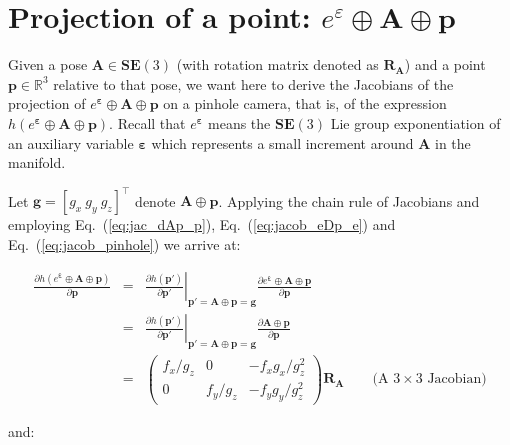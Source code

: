 \documentclass[a4paper,11pt]{report}
\newcommand{\E}{{\bm{\varepsilon}}}
\newcommand{\A}{{\mathbf{A}}}
\begin{document}
\section{Projection of a point: $e^\varepsilon \oplus \mathbf{A} \oplus \mathbf{p}$}

Given a pose $\mathbf{A} \in \mathbf{SE}(3)$ 
(with rotation matrix denoted as $\mathbf{R_A}$)
and a point 
$\mathbf{p} \in \mathbb{R}^3$
relative to that pose, we want here to derive the Jacobians of 
the projection of $e^\E \oplus \A \oplus \mathbf{p}$ on a pinhole camera, that is, 
of the expression $h(e^\E \oplus \A \oplus \mathbf{p})$.
Recall that $e^\E$ means the $\mathbf{SE}(3)$ Lie group exponentiation 
of an auxiliary variable $\E$ which represents a small increment around $\A$ in the manifold.

Let $\mathbf{g}=[g_x ~ g_y ~ g_z]^\top$ denote $\mathbf{A} \oplus \mathbf{p}$.
Applying the chain rule of Jacobians and employing Eq.~(\ref{eq:jac_dAp_p}), 
Eq.~(\ref{eq:jacob_eDp_e}) 
and  Eq.~(\ref{eq:jacob_pinhole})
we arrive at:

\begin{eqnarray}
\frac{\partial h(e^\E \oplus \A \oplus \mathbf{p})}{\partial \mathbf{p}} 
&=& 
\left. \frac{\partial h(\mathbf{p'})}{\partial \mathbf{p'}} \right|_{ \mathbf{p'} = \A \oplus \mathbf{p} = \mathbf{g} }
\frac{\partial e^\E \oplus \A \oplus \mathbf{p} }{\partial \mathbf{p}} \\
&=& 
\left. \frac{\partial h(\mathbf{p'})}{\partial \mathbf{p'}} \right|_{ \mathbf{p'} = \A \oplus \mathbf{p} = \mathbf{g} }
\frac{\partial \A \oplus \mathbf{p} }{\partial \mathbf{p}} \\
&=& 
\left(
\begin{array}{ccc}
 f_x / g_z   &    0    &  -f_x g_x / g_z^2   \\
 0 & f_y / g_z  &  -f_y g_y / g_z^2   
\end{array}
\right)
\mathbf{R_A} 
\quad\quad \text{(A $3 \times 3$ Jacobian)}
\end{eqnarray}

\noindent and:
\end{document}
